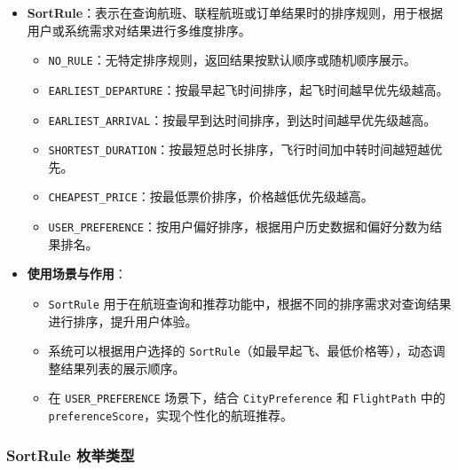 \documentclass[UTF8, a4paper,12pt]{ctexart}
\begin{document}
\begin{itemize}
    \item \textbf{SortRule}：表示在查询航班、联程航班或订单结果时的排序规则，用于根据用户或系统需求对结果进行多维度排序。
    \begin{itemize}
        \item \texttt{NO\_RULE}：无特定排序规则，返回结果按默认顺序或随机顺序展示。
        \item \texttt{EARLIEST\_DEPARTURE}：按最早起飞时间排序，起飞时间越早优先级越高。
        \item \texttt{EARLIEST\_ARRIVAL}：按最早到达时间排序，到达时间越早优先级越高。
        \item \texttt{SHORTEST\_DURATION}：按最短总时长排序，飞行时间加中转时间越短越优先。
        \item \texttt{CHEAPEST\_PRICE}：按最低票价排序，价格越低优先级越高。
        \item \texttt{USER\_PREFERENCE}：按用户偏好排序，根据用户历史数据和偏好分数为结果排名。
    \end{itemize}
    \item \textbf{使用场景与作用}：
    \begin{itemize}
        \item \texttt{SortRule} 用于在航班查询和推荐功能中，根据不同的排序需求对查询结果进行排序，提升用户体验。
        \item 系统可以根据用户选择的 \texttt{SortRule}（如最早起飞、最低价格等），动态调整结果列表的展示顺序。
        \item 在 \texttt{USER\_PREFERENCE} 场景下，结合 \texttt{CityPreference} 和 \texttt{FlightPath} 中的 \texttt{preferenceScore}，实现个性化的航班推荐。
    \end{itemize}
\end{itemize}

\subsubsection{SortRule 枚举类型}
\end{document}
